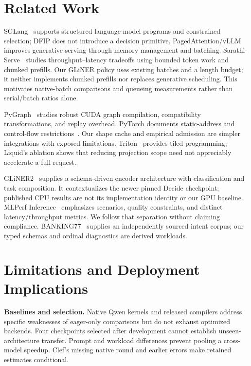 \documentclass[10pt,twocolumn]{article}
\begin{document}
\begin{table}[t]
\centering\small

\caption{GLiNER scheduled-arrival replay, 256 offered requests per mode/trace. p95 includes queueing and length estimation and uses completed requests. Drops/errors accompany latency. Compiled rows are a post hoc worker; transport and autoscaling are outside the experiment.}
\label{tab:gliner-serving}
\end{table}

\section{Related Work}
SGLang~\citep{sglang} supports structured language-model programs and constrained selection; DFIP does not introduce a decision primitive. PagedAttention/vLLM~\citep{vllm} improves generative serving through memory management and batching. Sarathi-Serve~\citep{sarathi} studies throughput--latency tradeoffs using bounded token work and chunked prefills. Our GLiNER policy uses existing batches and a length budget; it neither implements chunked prefills nor replaces generative scheduling. This motivates native-batch comparisons and queueing measurements rather than serial/batch ratios alone.

PyGraph~\citep{pygraph} studies robust CUDA graph compilation, compatibility transformations, and replay overhead. PyTorch documents static-address and control-flow restrictions~\citep{cudagraphs}. Our shape cache and empirical admission are simpler integrations with exposed limitations. Triton~\citep{triton} provides tiled programming; Liquid's ablation shows that reducing projection scope need not appreciably accelerate a full request.

GLiNER2~\citep{gliner2} supplies a schema-driven encoder architecture with classification and task composition. It contextualizes the newer pinned Decide checkpoint; published CPU results are not its implementation identity or our GPU baseline. MLPerf Inference~\citep{mlperf} emphasizes scenarios, quality constraints, and distinct latency/throughput metrics. We follow that separation without claiming compliance. BANKING77~\citep{banking} supplies an independently sourced intent corpus; our typed schemas and ordinal diagnostics are derived workloads.

\section{Limitations and Deployment Implications}
\textbf{Baselines and selection.} Native Qwen kernels and released compilers address specific weaknesses of eager-only comparisons but do not exhaust optimized backends. Four checkpoints selected after development cannot establish unseen-architecture transfer. Prompt and workload differences prevent pooling a cross-model speedup. Clef's missing native round and earlier errors make retained estimates conditional.
\end{document}
